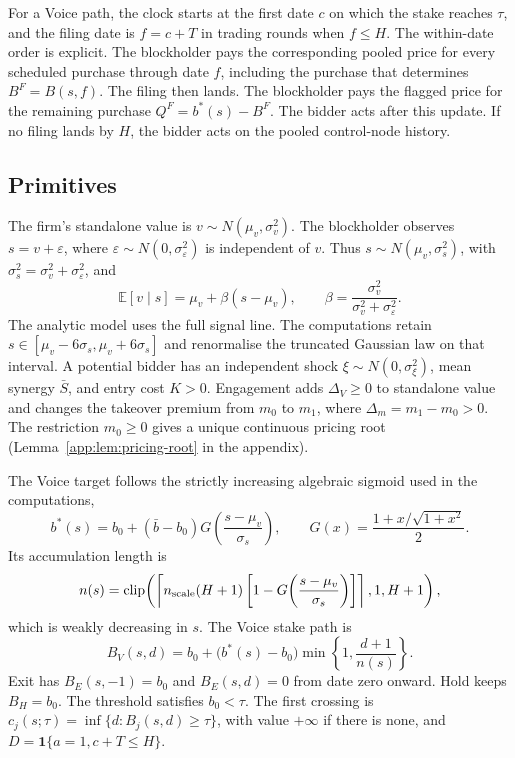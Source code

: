 \documentclass[11pt]{article}
\newcommand{\Eop}{\mathbb{E}}
\newcommand{\ind}{\mathbf{1}}
\begin{document}
For a Voice path, the clock starts at the first date $c$ on which the stake reaches $\tau$, and the
filing date is $f=c+T$ in trading rounds when $f\leq H$. The within-date order is explicit. The
blockholder pays the corresponding pooled price for every scheduled purchase through date $f$,
including the purchase that determines $B^F=B(s,f)$. The filing then lands. The blockholder pays the
flagged price for the remaining purchase $Q^F=b^*(s)-B^F$. The bidder acts after this update. If no
filing lands by $H$, the bidder acts on the pooled control-node history.

\subsection{Primitives}
\label{sec:primitives}

The firm's standalone value is $v\sim N(\mu_v,\sigma_v^2)$. The blockholder observes
$s=v+\varepsilon$, where $\varepsilon\sim N(0,\sigma_\varepsilon^2)$ is independent of $v$.
Thus $s\sim N(\mu_v,\sigma_s^2)$, with
$\sigma_s^2=\sigma_v^2+\sigma_\varepsilon^2$, and
\[
\Eop[v\mid s]=\mu_v+\beta(s-\mu_v),
\qquad
\beta=\frac{\sigma_v^2}{\sigma_v^2+\sigma_\varepsilon^2}.
\]
The analytic model uses the full signal line. The computations retain
$s\in[\mu_v-6\sigma_s,\mu_v+6\sigma_s]$ and renormalise the truncated Gaussian law on that
interval. A potential bidder has an independent shock $\xi\sim N(0,\sigma_\xi^2)$, mean synergy
$\bar S$, and entry cost $K>0$. Engagement adds $\Delta_V\geq0$ to standalone value and changes
the takeover premium from $m_0$ to $m_1$, where $\Delta_m=m_1-m_0>0$. The restriction
$m_0\geq0$ gives a unique continuous pricing root (Lemma~\ref{app:lem:pricing-root} in the appendix).

The Voice target follows the strictly increasing algebraic sigmoid used in the computations,
\[
b^*(s)=b_0+(\bar b-b_0)G\!\left(\frac{s-\mu_v}{\sigma_s}\right),
\qquad
G(x)=\frac{1+x/\sqrt{1+x^2}}{2}.
\]
Its accumulation length is
\[
n(s)=\operatorname{clip}\!\left(
\left\lceil n_{\rm scale}(H+1)
\left[1-G\!\left(\frac{s-\mu_v}{\sigma_s}\right)\right]\right\rceil,
1,H+1\right),
\]
which is weakly decreasing in $s$. The Voice stake path is
\[
B_V(s,d)=b_0+\bigl(b^*(s)-b_0\bigr)
\min\!\left\{1,\frac{d+1}{n(s)}\right\}.
\]
Exit has $B_E(s,-1)=b_0$ and $B_E(s,d)=0$ from date zero onward. Hold keeps $B_H=b_0$.
The threshold satisfies $b_0<\tau$. The first crossing is
$c_j(s;\tau)=\inf\{d:B_j(s,d)\geq\tau\}$, with value $+\infty$ if there is none, and
$D=\ind\{a=1,c+T\leq H\}$.
\end{document}
